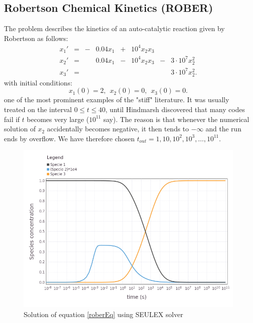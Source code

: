 \documentclass[notitlepage,12pt]{article}
\begin{document}

\subsection{Robertson Chemical Kinetics (ROBER)}
\label{sub:rober}
The problem describes the kinetics of an auto-catalytic reaction given by Robertson as follows:
\begin{equation}
\label{roberEq}
\begin{aligned}
x_1' &= &-&0.04x_1 &+ &10^4x_2x_3\\
x_2' &= & &0.04x_1 &- &10^4x_2x_3 &-&3\cdot 10^7x_2^2\\
x_3' &= & &        &  &           & &3\cdot 10^7x_2^2.
\end{aligned}
\end{equation}
with initial conditions:
\begin{equation}
x_1(0) = 2, \ \ x_2(0) = 0, \ \ x_3(0) = 0.
\end{equation}
one of the most prominent examples of the "stiff" literature. It was usually treated on the interval $0 \leq t \leq 40$, until Hindmarsh discovered that many codes fail if $t$ becomes very large ($10^{11}$ say). The reason is that whenever the numerical solution of $x_2$ accidentally becomes negative, it then tends to $-\infty$ and the run ends by overflow. We have therefore chosen $t_{out} = 1,10,10^2,10^3,\ldots,10^{11}$.

\begin{figure}[H]
\centering
\includegraphics[scale=0.60]{../ImagesAndPDFs/Plots/RoberPlot.png}
\caption{Solution of equation \eqref{roberEq} using SEULEX solver}
\label{fig:roberPlot}
\end{figure}
\end{document}
